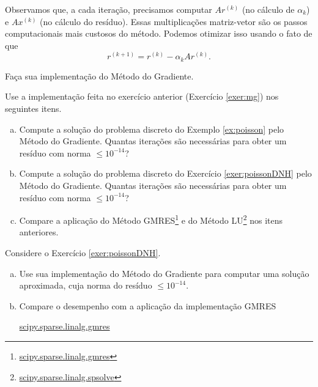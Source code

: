 \begin{obs}
  Observamos que, a cada iteração, precisamos computar $Ar^{(k)}$ (no cálculo de $\alpha_k$) e $Ax^{(k)}$ (no cálculo do resíduo). Essas multiplicações matriz-vetor são os passos computacionais mais custosos do método. Podemos otimizar isso usando o fato de que
  \begin{equation}
    r^{(k+1)} = r^{(k)} - \alpha_k Ar^{(k)}.
  \end{equation}
\end{obs}

% 

\begin{exer}\label{exer:mg}
  Faça sua implementação do Método do Gradiente.
\end{exer}

\begin{exer}\label{exer:mg}
  Use a implementação feita no exercício anterior (Exercício \ref{exer:mg}) nos seguintes itens.
  \begin{enumerate}[a)]
  \item Compute a solução do problema discreto do Exemplo \ref{ex:poisson} pelo Método do Gradiente. Quantas iterações são necessárias para obter um resíduo com norma $\leq 10^{-14}$?
  \item Compute a solução do problema discreto do Exercício \ref{exer:poissonDNH} pelo Método do Gradiente. Quantas iterações são necessárias para obter um resíduo com norma $\leq 10^{-14}$?
  \item Compare a aplicação do Método GMRES\footnote{\href{https://docs.scipy.org/doc/scipy/reference/generated/scipy.sparse.linalg.gmres.html}{scipy.sparse.linalg.gmres}} e do Método LU\footnote{\href{https://docs.scipy.org/doc/scipy/reference/generated/scipy.sparse.linalg.spsolve.html}{scipy.sparse.linalg.spsolve}} nos itens anteriores.
  \end{enumerate}
\end{exer}

\begin{exer}
  Considere o Exercício \ref{exer:poissonDNH}.
  \begin{enumerate}[a)]
  \item Use sua implementação do Método do Gradiente para computar uma solução aproximada, cuja norma do resíduo $\leq 10^{-14}$.
  \item Compare o desempenho com a aplicação da implementação GMRES
    \begin{center}
      \href{https://docs.scipy.org/doc/scipy/reference/generated/scipy.sparse.linalg.gmres.html}{scipy.sparse.linalg.gmres}
    \end{center}
  \end{enumerate}
\end{exer}

